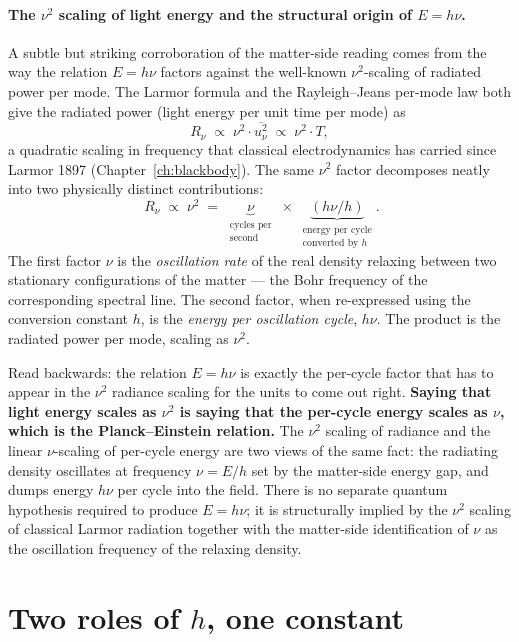 \paragraph{The $\nu^2$ scaling of light energy and the structural origin of $E = h\nu$.}
A subtle but striking corroboration of the matter-side reading comes from the way the relation $E = h\nu$ factors against the well-known $\nu^2$-scaling of radiated power per mode. The Larmor formula and the Rayleigh--Jeans per-mode law both give the radiated power (light energy per unit time per mode) as
\[
R_\nu \;\propto\; \nu^2 \cdot \overline{u_\nu^2} \;\propto\; \nu^2 \cdot T,
\]
a quadratic scaling in frequency that classical electrodynamics has carried since Larmor 1897 (Chapter~\ref{ch:blackbody}). The same $\nu^2$ factor decomposes neatly into two physically distinct contributions:
\[
\boxed{\;R_\nu \;\propto\; \nu^2 \;=\; \underbrace{\nu}_{\substack{\text{cycles per}\\ \text{second}}} \;\times\; \underbrace{(h\nu/h)}_{\substack{\text{energy per cycle}\\ \text{converted by } h}}.}
\]
The first factor $\nu$ is the \emph{oscillation rate} of the real density relaxing between two stationary configurations of the matter --- the Bohr frequency of the corresponding spectral line. The second factor, when re-expressed using the conversion constant $h$, is the \emph{energy per oscillation cycle}, $h\nu$. The product is the radiated power per mode, scaling as $\nu^2$.

Read backwards: the relation $E = h\nu$ is exactly the per-cycle factor that has to appear in the $\nu^2$ radiance scaling for the units to come out right. \textbf{Saying that light energy scales as $\nu^2$ is saying that the per-cycle energy scales as $\nu$, which is the Planck--Einstein relation.} The $\nu^2$ scaling of radiance and the linear $\nu$-scaling of per-cycle energy are two views of the same fact: the radiating density oscillates at frequency $\nu = E / h$ set by the matter-side energy gap, and dumps energy $h\nu$ per cycle into the field. There is no separate quantum hypothesis required to produce $E = h\nu$; it is structurally implied by the $\nu^2$ scaling of classical Larmor radiation together with the matter-side identification of $\nu$ as the oscillation frequency of the relaxing density.

\section{Two roles of $h$, one constant}\label{sec:hf-two-roles}

